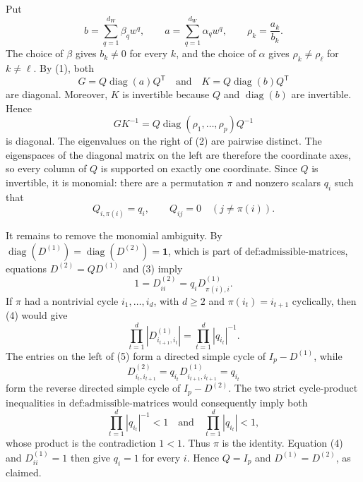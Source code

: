 Put
\[
 b=\sum_{q=1}^{d_W}\beta_qw^q,\qquad
 a=\sum_{q=1}^{d_W}\alpha_qw^q,\qquad
 \rho_k=\frac{a_k}{b_k}.
\]
The choice of \(\beta\) gives \(b_k\ne0\) for every \(k\), and the choice of \(\alpha\) gives \(\rho_k\ne\rho_\ell\) for \(k\ne\ell\).  By (1), both
\[
 G=Q\operatorname{diag}(a)Q^{\mathsf T}\quad\text{and}\quad
 K=Q\operatorname{diag}(b)Q^{\mathsf T}
\]
are diagonal.  Moreover, \(K\) is invertible because \(Q\) and \(\operatorname{diag}(b)\) are invertible.  Hence
\[
 GK^{-1}
 =Q\operatorname{diag}(\rho_1,\ldots,\rho_p)Q^{-1} \tag{2}
\]
is diagonal.  The eigenvalues on the right of (2) are pairwise distinct.  The eigenspaces of the diagonal matrix on the left are therefore the coordinate axes, so every column of \(Q\) is supported on exactly one coordinate.  Since \(Q\) is invertible, it is monomial: there are a permutation \(\pi\) and nonzero scalars \(q_i\) such that
\[
 Q_{i,\pi(i)}=q_i,\qquad Q_{ij}=0\quad(j\ne\pi(i)). \tag{3}
\]

It remains to remove the monomial ambiguity.  By \(\operatorname{diag}(D^{(1)})=\operatorname{diag}(D^{(2)})=\mathbf 1\), which is part of \(\text{def:admissible-matrices}\), equations \(D^{(2)}=QD^{(1)}\) and (3) imply
\[
 1=D^{(2)}_{ii}=q_iD^{(1)}_{\pi(i),i}. \tag{4}
\]
If \(\pi\) had a nontrivial cycle \(i_1,\ldots,i_d\), with \(d\ge2\) and \(\pi(i_t)=i_{t+1}\) cyclically, then (4) would give
\[
 \prod_{t=1}^d\left|D^{(1)}_{i_{t+1},i_t}\right|
 =\prod_{t=1}^d|q_{i_t}|^{-1}. \tag{5}
\]
The entries on the left of (5) form a directed simple cycle of \(I_p-D^{(1)}\), while
\[
 D^{(2)}_{i_t,i_{t+1}}
 =q_{i_t}D^{(1)}_{i_{t+1},i_{t+1}}=q_{i_t}
\]
form the reverse directed simple cycle of \(I_p-D^{(2)}\).  The two strict cycle-product inequalities in \(\text{def:admissible-matrices}\) would consequently imply both
\[
 \prod_{t=1}^d|q_{i_t}|^{-1}<1
 \quad\text{and}\quad
 \prod_{t=1}^d|q_{i_t}|<1,
\]
whose product is the contradiction \(1<1\).  Thus \(\pi\) is the identity.  Equation (4) and \(D^{(1)}_{ii}=1\) then give \(q_i=1\) for every \(i\).  Hence \(Q=I_p\) and \(D^{(1)}=D^{(2)}\), as claimed.
